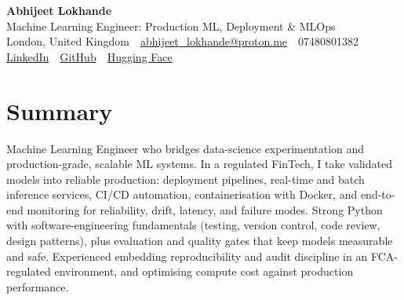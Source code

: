\documentclass[10pt,a4paper]{article}
\newcommand{\sep}{\,\textcolor{accent!60}{\textbar}\,}
\begin{document}
\begin{center}
  {\fontsize{24}{26}\selectfont\bfseries Abhijeet Lokhande}\\[3pt]
  {\color{accent}\large Machine Learning Engineer: Production ML, Deployment \& MLOps}\\[5pt]
  {\small
    London, United Kingdom \sep
    \href{mailto:abhijeet_lokhande@proton.me}{abhijeet\_lokhande@proton.me} \sep
    07480801382 \\[2pt]
    \href{https://www.linkedin.com/in/ablds/}{LinkedIn} \sep
    \href{https://github.com/abhijeetscode}{GitHub} \sep
    \href{https://huggingface.co/ab-ai}{Hugging Face}
  }
\end{center}
\vspace{2pt}

\section{Summary}
Machine Learning Engineer who bridges data-science experimentation and production-grade, scalable ML systems. In a regulated FinTech, I take validated models into reliable production: deployment pipelines, real-time and batch inference services, CI/CD automation, containerisation with Docker, and end-to-end monitoring for reliability, drift, latency, and failure modes. Strong Python with software-engineering fundamentals (testing, version control, code review, design patterns), plus evaluation and quality gates that keep models measurable and safe. Experienced embedding reproducibility and audit discipline in an FCA-regulated environment, and optimising compute cost against production performance.

\end{document}
